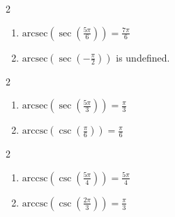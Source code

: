 \documentclass{ximera}
\begin{document}
\begin{multicols}{2}

\begin{enumerate}

\setcounter{enumi}{\value{HW}}

\item  $\text{arcsec}\left(\sec\left( \frac{5\pi}{6} \right) \right) = \frac{7\pi}{6}$
\item  $\text{arcsec}\left(\sec\left(-\frac{\pi}{2} \right) \right)$ is undefined. 

\setcounter{HW}{\value{enumi}}

\end{enumerate}

\end{multicols}

\begin{multicols}{2}

\begin{enumerate}

\setcounter{enumi}{\value{HW}}

\item  $\text{arcsec}\left(\sec\left(\frac{5\pi}{3}\right) \right) = \frac{\pi}{3}$
\item  $\text{arccsc}\left(\csc\left(\frac{\pi}{6}\right) \right) = \frac{\pi}{6}$ 

\setcounter{HW}{\value{enumi}}

\end{enumerate}

\end{multicols}

\begin{multicols}{2}

\begin{enumerate}

\setcounter{enumi}{\value{HW}}

\item  $\text{arccsc}\left(\csc\left(\frac{5\pi}{4}\right) \right) = \frac{5\pi}{4}$
\item  $\text{arccsc}\left(\csc\left( \frac{2\pi}{3} \right) \right) = \frac{\pi}{3}$

\setcounter{HW}{\value{enumi}}

\end{enumerate}

\end{multicols}
\end{document}
